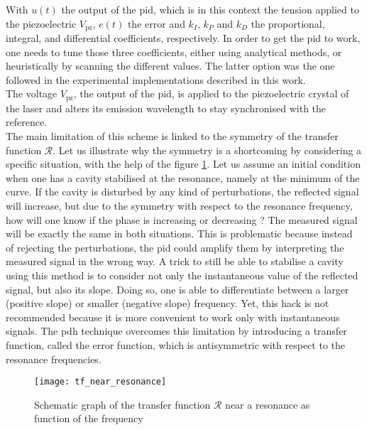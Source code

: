 With $u(t)$ the output of the \gls{pid}, which is in this context the tension applied to the piezoelectric $V_{\text{pz}}$, $e(t)$ the error and $k_I$, $k_P$ and $k_D$ the proportional, integral, and differential coefficients, respectively. In order to get the \gls{pid} to work, one needs to tune those three coefficients, either using analytical methods, or heuristically by scanning the different values. The latter option was the one followed in the experimental implementations described in this work.\\

The voltage $V_{\text{pz}}$, the output of the \gls{pid}, is applied to the piezoelectric crystal of the laser and alters its emission wavelength to stay synchronised with the reference.\\

The main limitation of this scheme is linked to the symmetry of the transfer function $\mathcal{R}$. Let us illustrate why the symmetry is a shortcoming by considering a specific situation, with the help of the figure \ref{tf_near_resonance}.  Let us assume an initial condition when one has a cavity stabilised at the resonance, namely at the minimum of the curve. If the cavity is disturbed by any kind of perturbations, the reflected signal will increase, but due to the symmetry with respect to the resonance frequency, how will one know if the phase is increasing or decreasing ? The measured signal will be exactly the same in both situations. This is problematic because instead of rejecting the perturbations, the \gls{pid} could amplify them by interpreting the measured signal in the wrong way. A trick to still be able to stabilise a cavity using this method is to consider not only the instantaneous value of the reflected signal, but also its slope. Doing so, one is able to differentiate between a larger (positive slope) or smaller (negative slope) frequency. Yet, this hack is not recommended because it is more convenient to work only with instantaneous signals. The \gls{pdh} technique overcomes this limitation by introducing a transfer function, called the error function, which is antisymmetric with respect to the resonance frequencies.

\begin{figure}
	\centering
	\texttt{[image: tf\_near\_resonance]}
	\caption{Schematic graph of the transfer function $\mathcal{R}$ near a resonance as function of the frequency \cite{nickersonreview}}
	\label{tf_near_resonance}
\end{figure}

